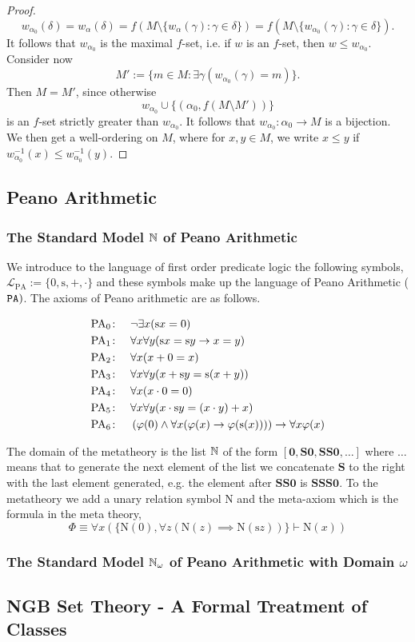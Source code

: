 \begin{proof}
    $$w_{\alpha_0}(\delta)=w_{\alpha}(\delta)=f(M\setminus \{w_\alpha(\gamma) : \gamma \in \delta\})=f(M\setminus \{w_{\alpha_0}(\gamma) : \gamma\in \delta\}).$$
    It follows that $w_{\alpha_0}$ is the maximal $f$-set, i.e. if $w$ is an $f$-set, then $w\leq w_{\alpha_0}$. Consider now 
    $$M':=\{m\in M : \exists \gamma(w_{\alpha_0}(\gamma)=m)\}.$$
    Then $M=M'$, since otherwise 
    $$w_{\alpha_0}\cup \{(\alpha_0, f(M\setminus M'))\}$$
    is an $f$-set strictly greater than $w_{\alpha_0}$. It follows that $w_{\alpha_0}:\alpha_0\rightarrow M$ is a bijection. We then get a well-ordering on $M$, where for $x,y\in M$, we write $x\leq y$ if $w_{\alpha_0}^{-1}(x)\leq w_{\alpha_0}^{-1}(y)$.
\end{proof}
\subsection{Peano Arithmetic}
\subsubsection{The Standard Model $\mathbb{N}$ of Peano Arithmetic}
We introduce to the language of first order predicate logic the following symbols, $\mathcal{L}_{\mathrm{PA}}:=\{0,\mathrm{s},+,\cdot\}$ and these symbols make up the language of Peano Arithmetic ($\verb|PA|)$. The axioms of Peano arithmetic are as follows. 
    \begin{axioms}
        \begin{align*}
            \mathrm{PA}_0\colon\quad & \neg \exists x (\mathrm{s} x = 0) \\
            \mathrm{PA}_1\colon\quad & \forall x \forall y (\mathrm{s} x = \mathrm{s} y \rightarrow x = y) \\
            \mathrm{PA}_2\colon\quad & \forall x (x + 0 = x) \\
            \mathrm{PA}_3\colon\quad & \forall x \forall y (x + \mathrm{s} y = \mathrm{s}(x + y)) \\
            \mathrm{PA}_4\colon\quad & \forall x (x \cdot 0 = 0) \\
            \mathrm{PA}_5\colon\quad & \forall x \forall y (x \cdot \mathrm{s} y = (x \cdot y) + x) \\
            \mathrm{PA}_6\colon\quad & \left( \varphi(0) \land \forall x (\varphi(x) \rightarrow \varphi(\mathrm{s} (x))) \right) \rightarrow \forall x \varphi(x)
        \end{align*}
    \end{axioms}
The domain of the metatheory is the list $\mathbb{N}$ of the form $[\mathbf{0},\mathbf{S0},\mathbf{SS0},\dots]$
where $\dots$ means that to generate the next element of the list we concatenate $\mathbf{S}$ to the right with the last element generated, e.g. the element after $\mathbf{SS0}$ is $\mathbf{SSS0}$. To the metatheory we add a unary relation symbol $\mathrm{N}$ and the meta-axiom which is the formula in the meta theory,
$$\Phi \equiv \forall x\left(\{\mathrm{N}(0), \forall z(\mathrm{N}(z)\implies \mathrm{N}(\mathrm{s}z))\}\vdash \mathrm{N}(x)\right)$$ 

\subsubsection{The Standard Model $\mathbb{N}_\omega$ of Peano Arithmetic with Domain $\omega$}
\subsection{NGB Set Theory - A Formal Treatment of Classes}
